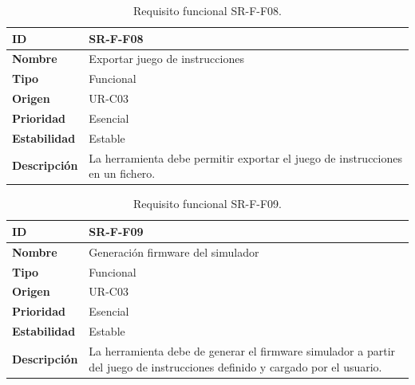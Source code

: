 \begin{center}
\begin{table}[htbp]
\centering
\caption{Requisito funcional SR-F-F08.}
\begin{tabular}{@{}p{2.5cm} p{9cm}@{}} 
\toprule
\textbf{ID} 				& SR-F-F08 \\
\midrule
\textbf{Nombre} 			& Exportar juego de instrucciones\\
\midrule
\textbf{Tipo} 			& Funcional \\
\midrule
\textbf{Origen} 			& UR-C03 \\
\midrule
\textbf{Prioridad}		& Esencial \\
\midrule
\textbf{Estabilidad} 		& Estable \\
\midrule
\textbf{Descripción} 	& La herramienta debe permitir exportar el juego de instrucciones en un fichero. \\
\bottomrule
\end{tabular}
\label{tab:srff08}
\end{table}
\end{center}

\begin{center}
\begin{table}[htbp]
\centering
\caption{Requisito funcional SR-F-F09.}
\begin{tabular}{@{}p{2.5cm} p{9cm}@{}} 
\toprule
\textbf{ID} 				& SR-F-F09 \\
\midrule
\textbf{Nombre} 			& Generación firmware del simulador\\
\midrule
\textbf{Tipo} 			& Funcional \\
\midrule
\textbf{Origen} 			& UR-C03 \\
\midrule
\textbf{Prioridad}		& Esencial \\
\midrule
\textbf{Estabilidad} 		& Estable \\
\midrule
\textbf{Descripción} 	& La herramienta debe de generar el firmware simulador a partir del juego de instrucciones definido y cargado por el usuario. \\
\bottomrule
\end{tabular}
\label{tab:srff09}
\end{table}
\end{center}

